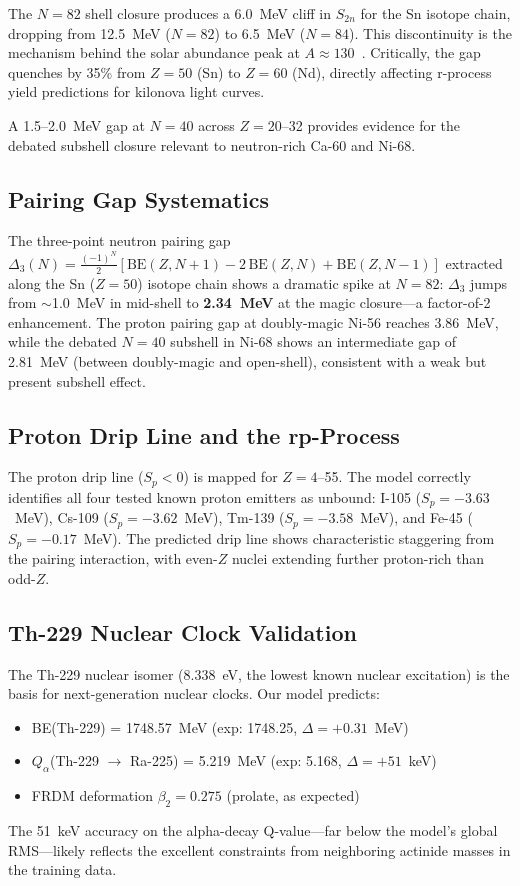 \documentclass[twocolumn,letterpaper,10pt]{article}
\begin{document}
The $N=82$ shell closure produces a 6.0~MeV cliff in $S_{2n}$ for the Sn
isotope chain, dropping from 12.5~MeV ($N=82$) to 6.5~MeV ($N=84$). This
discontinuity is the mechanism behind the solar abundance peak at
$A \approx 130$~\cite{cowan2021}. Critically, the gap quenches by 35\%
from $Z=50$ (Sn) to $Z=60$ (Nd), directly affecting r-process yield
predictions for kilonova light curves.

A 1.5--2.0~MeV gap at $N=40$ across $Z=20$--32 provides evidence for
the debated subshell closure relevant to neutron-rich Ca-60 and Ni-68.

\subsection{Pairing Gap Systematics}

The three-point neutron pairing gap $\Delta_3(N) = \tfrac{(-1)^N}{2}
[\text{BE}(Z,N{+}1) - 2\,\text{BE}(Z,N) + \text{BE}(Z,N{-}1)]$ extracted
along the Sn ($Z=50$) isotope chain shows a dramatic spike at $N=82$:
$\Delta_3$ jumps from $\sim$1.0~MeV in mid-shell to \textbf{2.34~MeV} at
the magic closure---a factor-of-2 enhancement. The proton pairing gap at
doubly-magic Ni-56 reaches 3.86~MeV, while the debated $N=40$ subshell in
Ni-68 shows an intermediate gap of 2.81~MeV (between doubly-magic and
open-shell), consistent with a weak but present subshell effect.

\subsection{Proton Drip Line and the rp-Process}

The proton drip line ($S_p < 0$) is mapped for $Z=4$--55. The model
correctly identifies all four tested known proton emitters as unbound:
I-105 ($S_p = -3.63$~MeV), Cs-109 ($S_p = -3.62$~MeV), Tm-139
($S_p = -3.58$~MeV), and Fe-45 ($S_p = -0.17$~MeV). The predicted
drip line shows characteristic staggering from the pairing interaction,
with even-$Z$ nuclei extending further proton-rich than odd-$Z$.

\subsection{Th-229 Nuclear Clock Validation}

The Th-229 nuclear isomer (8.338~eV, the lowest known nuclear excitation)
is the basis for next-generation nuclear clocks. Our model predicts:
\begin{itemize}
\item BE(Th-229) = 1748.57~MeV (exp: 1748.25, $\Delta = +0.31$~MeV)
\item $Q_\alpha$(Th-229 $\to$ Ra-225) = 5.219~MeV (exp: 5.168,
      $\Delta = +51$~keV)
\item FRDM deformation $\beta_2 = 0.275$ (prolate, as expected)
\end{itemize}
The 51~keV accuracy on the alpha-decay Q-value---far below the model's
global RMS---likely reflects the excellent constraints from neighboring
actinide masses in the training data.
\end{document}
